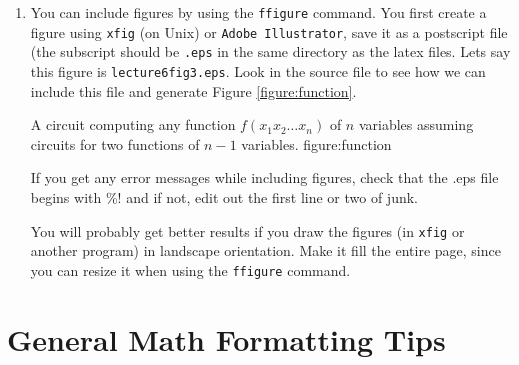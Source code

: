 \begin{enumerate}
\item You can include figures by using the {\tt ffigure} command.
You first create a figure using {\tt xfig} (on Unix)
or {\tt Adobe Illustrator},
save it as a postscript file (the subscript should be {\tt .eps} in the same
directory as the latex files. Lets say this figure is {\tt lecture6fig3.eps}. 
Look
in the source file to see how we can include this file and generate
Figure \ref{figure:function}.

{A circuit computing any function $f(x_1 x_2 \ldots x_n)$ of $n$ variables assuming circuits for two functions of $n-1$ variables.}
{figure:function}




If you get any error messages while including figures, check that the .eps file
begins with \%! and if not, edit out the first line or two of junk.

You will probably get better results if you draw the figures (in {\tt xfig} or
another program) in landscape orientation. Make it fill the entire page,
since you can resize it when using the {\tt ffigure} command.

\end{enumerate}

\section{General Math Formatting Tips}

